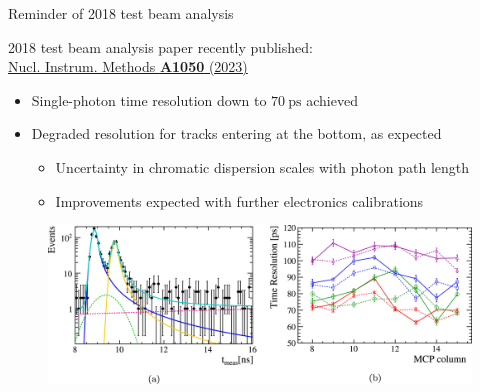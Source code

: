 \documentclass[xcolor={dvipsnames}]{beamer}
\begin{document}
\begin{frame}{Reminder of 2018 test beam analysis}
  \vspace{0.0cm}
  \begin{center}
    {\large 2018 test beam analysis paper recently published:\\}
    {\small \href{https://www.sciencedirect.com/science/article/pii/S0168900223001717}{Nucl. Instrum. Methods \textbf{A1050} (2023)}}
  \end{center}
  \begin{itemize}
    \setlength\itemsep{1.0em}
    \item{Single-photon time resolution down to $\SI{70}{\pico\second}$ achieved}
    \item{Degraded resolution for tracks entering at the bottom, as expected}
    \begin{itemize}
      \item{Uncertainty in chromatic dispersion scales with photon path length}
      \item{Improvements expected with further electronics calibrations}
    \end{itemize}
  \end{itemize}
  \begin{figure}
    \centering
    \includegraphics[width = 1.0\textwidth]{Figs/TORCH_testbeam_2018_TimeResolution.jpg}
  \end{figure}
\end{frame}
\end{document}
